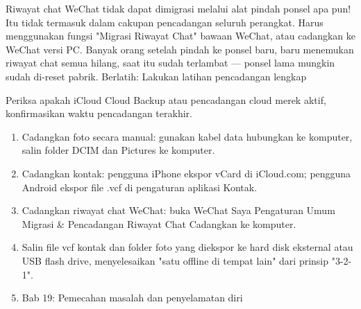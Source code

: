 \begin{tcbwarn}{Riwayat chat WeChat tidak dapat dimigrasi melalui alat pindah ponsel apa pun! Itu tidak termasuk dalam cakupan pencadangan seluruh perangkat. Harus menggunakan fungsi "Migrasi Riwayat Chat" bawaan WeChat, atau cadangkan ke WeChat versi PC. Banyak orang setelah pindah ke ponsel baru, baru menemukan riwayat chat semua hilang, saat itu sudah terlambat — ponsel lama mungkin sudah di-reset pabrik.}
Berlatih: Lakukan latihan pencadangan lengkap

\end{tcbwarn}

\begin{tcbpractice}{Periksa apakah iCloud Cloud Backup atau pencadangan cloud merek aktif, konfirmasikan waktu pencadangan terakhir.}
\begin{enumerate}
  \item Cadangkan foto secara manual: gunakan kabel data hubungkan ke komputer, salin folder DCIM dan Pictures ke komputer.
  \item Cadangkan kontak: pengguna iPhone ekspor vCard di iCloud.com; pengguna Android ekspor file .vcf di pengaturan aplikasi Kontak.
  \item Cadangkan riwayat chat WeChat: buka WeChat Saya Pengaturan Umum Migrasi \& Pencadangan Riwayat Chat Cadangkan ke komputer.
  \item Salin file vcf kontak dan folder foto yang diekspor ke hard disk eksternal atau USB flash drive, menyelesaikan "satu offline di tempat lain" dari prinsip "3-2-1".
  \item Bab 19: Pemecahan masalah dan penyelamatan diri
\end{enumerate}

\end{tcbpractice}
